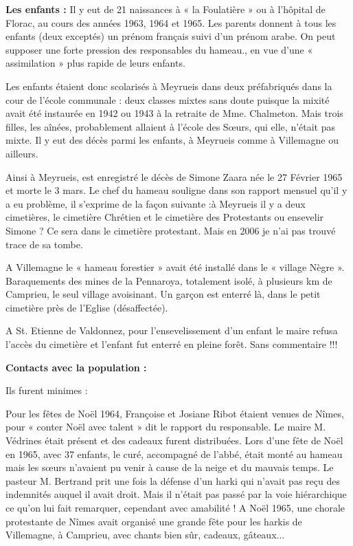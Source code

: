 \textbf{Les enfants :} Il y eut de 21 naissances à « la Foulatière » ou à l’hôpital de Florac, au
cours des années 1963, 1964 et 1965. Les parents donnent à tous les enfants (deux
exceptés) un prénom français suivi d’un prénom arabe. On peut supposer une forte
pression des responsables du hameau., en vue d’une « assimilation » plus rapide de
leurs enfants.

Les enfants étaient donc scolarisés à Meyrueis dans deux préfabriqués dans la cour de
l’école communale : deux classes mixtes sans doute puisque la mixité avait été
instaurée en 1942 ou 1943 à la retraite de Mme. Chalmeton.
Mais trois filles, les aînées, probablement allaient à l’école des Sœurs, qui elle, n’était
pas mixte.
Il y eut des décès parmi les enfants, à Meyrueis comme à Villemagne ou ailleurs.

Ainsi à Meyrueis, est enregistré le décès de Simone Zaara née le 27 Février 1965 et
morte le 3 mars. Le chef du hameau souligne dans son rapport mensuel qu’il y a eu
problème, il s’exprime de la façon suivante :à Meyrueis il y a deux cimetières, le
cimetière Chrétien et le cimetière des Protestants ou ensevelir Simone ?
Ce sera dans le cimetière protestant. Mais en 2006 je n’ai pas trouvé trace de sa
tombe.

A Villemagne le « hameau forestier » avait été installé dans le « village
Nègre ». Baraquements des mines de la Pennaroya, totalement isolé, à plusieurs km de
Camprieu, le seul village avoisinant. Un garçon est enterré là, dans le petit cimetière
près de l’Eglise (désaffectée).

A St. Etienne de Valdonnez, pour l’ensevelissement d’un enfant le maire refusa
l’accès du cimetière et l’enfant fut enterré en pleine forêt.
Sans commentaire !!!

\textbf{Contacts avec la population :}

Ils furent minimes :

Pour les fêtes de Noël 1964, Françoise et Josiane Ribot étaient venues de Nîmes, pour
« conter Noël avec talent » dit le rapport du responsable. Le maire M. Védrines était
présent et des cadeaux furent distribuées.
Lors d’une fête de Noël en 1965, avec 37 enfants, le curé, accompagné de l’abbé,
était monté au hameau mais les sœurs n’avaient pu venir à cause de la neige et du
mauvais temps.
Le pasteur M. Bertrand prit une fois la défense d’un harki qui n’avait pas reçu des
indemnités auquel il avait droit. Mais il n’était pas passé par la voie hiérarchique ce
qu’on lui fait remarquer, cependant avec amabilité !
A Noël 1965, une chorale protestante de Nîmes avait organisé une grande fête pour
les harkis de Villemagne, à Camprieu, avec chants bien sûr, cadeaux, gâteaux...

